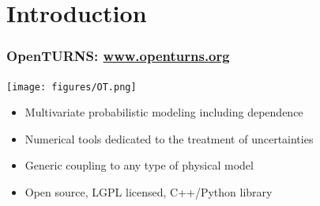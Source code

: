 \documentclass{beamer}
\begin{document}
\section{Introduction}


\begin{frame}
\frametitle{OpenTURNS: \url{www.openturns.org}}


    \begin{center}
    \texttt{[image: figures/OT.png]}
    \end{center}
	
\begin{itemize}
\item Multivariate probabilistic modeling including dependence
\item Numerical tools dedicated to the treatment of uncertainties
\item Generic coupling to any type of physical model
\item Open source, LGPL licensed, C++/Python library
\end{itemize}


\end{frame}

\end{document}
